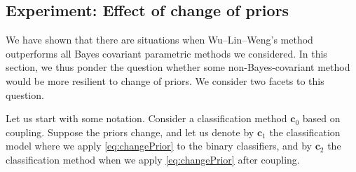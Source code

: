 %
%
%
%
%
%
%
%

\subsection{Experiment: Effect of change of priors}  \label{sec:exp4}

We have shown that there are situations when Wu--Lin--Weng's method outperforms
all Bayes covariant parametric methods we considered. 
In this section, we thus ponder 
the question whether some non-Bayes-covariant method would be more resilient to change of priors. We consider two facets to this question.

Let us start with some notation. Consider a classification method $\boldsymbol{c}_0$ based on coupling. Suppose the priors change, and let us denote by $\boldsymbol{c}_1$ the classification model where we apply \eqref{eq:changePrior} to the binary classifiers, and by $\boldsymbol{c}_2$ the classification method when we apply \eqref{eq:changePrior} after coupling. 

